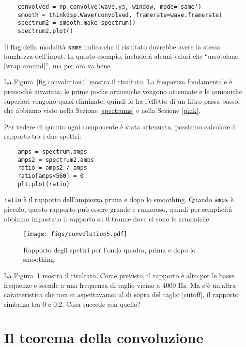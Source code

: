 \documentclass[12pt,a4paper]{book}
\begin{document}
\begin{verbatim} 
    convolved = np.convolve(wave.ys, window, mode='same')
    smooth = thinkdsp.Wave(convolved, framerate=wave.framerate)
    spectrum2 = smooth.make_spectrum()
    spectrum2.plot()
 \end{verbatim} 

Il flag della modalità {\tt same} indica che il risultato dovrebbe avere la stessa lunghezza dell'input. In questo esempio, includerà alcuni valori che ``arrotolano [wrap around]'', ma per ora va bene.

La Figura~\ref{fig.convolution4} mostra il risultato. La frequenza fondamentale è pressoché invariata; le prime poche armoniche vengono attenuate e le armoniche superiori vengono quasi eliminate. quindi lo ha l'effetto di un filtro passa-basso, che abbiamo visto nella Sezione \ref{spectrums} e nella Sezione \ref{pink}.

Per vedere di quanto ogni componente è stata attenuata, possiamo calcolare il rapporto tra i due spettri:

\begin{verbatim} 
    amps = spectrum.amps
    amps2 = spectrum2.amps
    ratio = amps2 / amps
    ratio[amps<560] = 0
    plt.plot(ratio)
 \end{verbatim} 

{\tt ratio} è il rapporto dell'ampiezza prima e dopo lo smoothing. Quando {\tt amps} è piccolo, questo rapporto può essere grande e rumoroso, quindi per semplicità abbiamo impostato il rapporto su 0 tranne dove ci sono le armoniche.

\begin{figure} 

\centerline{\texttt{[image: figs/convolution5.pdf]}} \caption{Rapporto degli spettri per l'onda quadra, prima e dopo lo smoothing.} \label{fig.convolution5} \end{figure} 

La Figura~\ref{fig.convolution5} mostra il risultato. Come previsto, il rapporto è alto per le basse frequenze e scende a una frequenza di taglio vicino a 4000 Hz. Ma c'è un'altra caratteristica che non ci aspettavamo: al di sopra del taglio [cutoff], il rapporto rimbalza tra 0 e 0.2. Cosa succede con quello?

\section{Il teorema della convoluzione} \label{convtheorem} 
\end{document}
